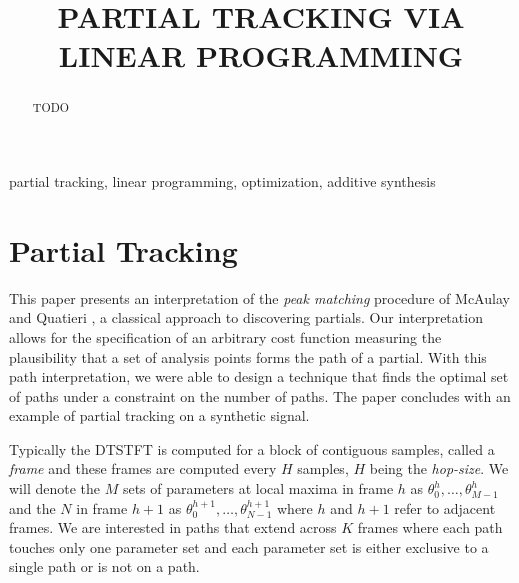 \documentclass{article}
\title{PARTIAL TRACKING VIA LINEAR PROGRAMMING}
\begin{document}
\ninept
\maketitle

\begin{sloppy}

\begin{abstract}
    TODO
\end{abstract}

\begin{keywords}
partial tracking, linear programming, optimization, additive synthesis
\end{keywords}

\section{Partial Tracking\label{chap:partialtracking}}


This paper presents an interpretation of the \textit{peak matching} procedure
of McAulay and Quatieri \cite{mcaulay1986speech}, a classical approach to discovering partials. Our
interpretation allows for the specification of an arbitrary cost function
measuring the plausibility that a set of analysis points forms the path of a
partial. With this path interpretation, we were able to design a technique that finds the
optimal set of paths under a constraint on the number of paths. The paper 
concludes with an example of partial tracking on a synthetic signal.

Typically the DTSTFT is computed for a block of contiguous samples, called a
\textit{frame} and these frames are computed every $H$ samples, $H$ being the
\textit{hop-size}. We will denote the $M$ sets of parameters at local maxima in
frame $h$ as $\theta_0^{h}, \dotsc, \theta_{M-1}^{h}$ and the $N$ in frame $h+1$
as $\theta_0^{h+1}, \dotsc, \theta_{N-1}^{h+1}$ where $h$ and $h+1$ refer to
adjacent frames. We are interested in paths that extend across $K$ frames where
each path touches only one parameter set and each parameter set is either
exclusive to a single path or is not on a path.


\end{sloppy}
\end{document}
